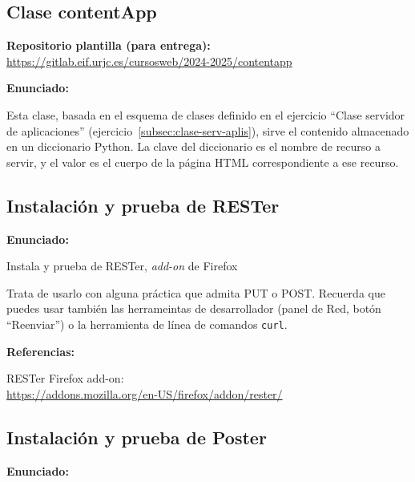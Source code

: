 \subsection{Clase contentApp}
\label{subsec:contentapp}

\textbf{Repositorio plantilla (para entrega):} \\
\url{https://gitlab.eif.urjc.es/cursosweb/2024-2025/contentapp}

\textbf{Enunciado:}

Esta clase, basada en el esquema de clases definido en el ejercicio ``Clase servidor de aplicaciones'' (ejercicio~\ref{subsec:clase-serv-aplis}), sirve el contenido almacenado en un diccionario Python. La clave del diccionario es el nombre de recurso a servir, y el valor es el cuerpo de la página HTML correspondiente a ese recurso.

\subsection{Instalación y prueba de RESTer}
\label{subsec:inst-rester}

\textbf{Enunciado:}

Instala y prueba de RESTer, \emph{add-on} de Firefox

Trata de usarlo con alguna práctica que admita PUT o POST. Recuerda que puedes usar también las herrameintas de desarrollador (panel de Red, botón ``Reenviar'') o la herramienta de línea de comandos \verb|curl|.

\textbf{Referencias:}

RESTer Firefox add-on: \\
\url{https://addons.mozilla.org/en-US/firefox/addon/rester/}


\subsection{Instalación y prueba de Poster}
\label{subsec:inst-poster}

\textbf{Enunciado:}

